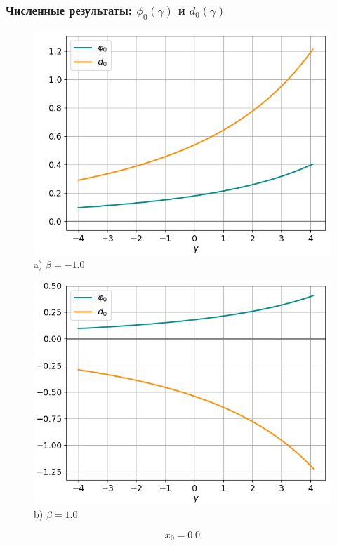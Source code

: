 \documentclass[fullscreen=true, unicode, bookmarks=false]{beamer}
\begin{document}
\begin{frame}
\frametitle{ Численные результаты: $ \phi_0(\gamma) $ и $ d_0(\gamma) $ }

\begin{figure} 
\begin{minipage}[h]{0.49\linewidth}
\begin{center}
\includegraphics[scale=0.35]{oscillating_phi0d0_x0=0,0,beta=-1,0.png} \\ {\scriptsize a) $ \beta = -1.0 $}
\end{center}
\end{minipage} 
\hfill
\begin{minipage}[h]{0.49\linewidth}
\begin{center}
\includegraphics[scale=0.35]{oscillating_phi0d0_x0=0,0_beta=1,0.png}  \\ {\scriptsize b) $ \beta = 1.0 $}
\end{center}
\end{minipage} 
\end{figure}

$$ x_0 = 0.0 $$

\end{frame}
\end{document}
